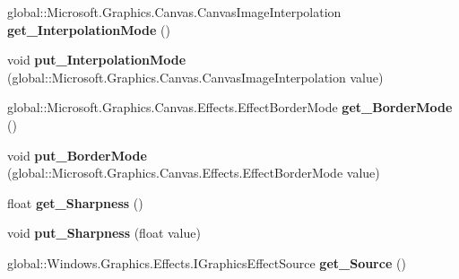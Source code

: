 \begin{DoxyCompactItemize}
global\+::\+Microsoft.\+Graphics.\+Canvas.\+Canvas\+Image\+Interpolation {\bfseries get\+\_\+\+Interpolation\+Mode} ()
\item 
\mbox{\label{interface_microsoft_1_1_graphics_1_1_canvas_1_1_effects_1_1_i_scale_effect_aaaff922db5597526bd069b5b3cfa1bf3}} 
void {\bfseries put\+\_\+\+Interpolation\+Mode} (global\+::\+Microsoft.\+Graphics.\+Canvas.\+Canvas\+Image\+Interpolation value)
\item 
\mbox{\label{interface_microsoft_1_1_graphics_1_1_canvas_1_1_effects_1_1_i_scale_effect_ac46828996e589095068e0beff4165185}} 
global\+::\+Microsoft.\+Graphics.\+Canvas.\+Effects.\+Effect\+Border\+Mode {\bfseries get\+\_\+\+Border\+Mode} ()
\item 
\mbox{\label{interface_microsoft_1_1_graphics_1_1_canvas_1_1_effects_1_1_i_scale_effect_a56c46fac62fdf0f627612c3363b495f4}} 
void {\bfseries put\+\_\+\+Border\+Mode} (global\+::\+Microsoft.\+Graphics.\+Canvas.\+Effects.\+Effect\+Border\+Mode value)
\item 
\mbox{\label{interface_microsoft_1_1_graphics_1_1_canvas_1_1_effects_1_1_i_scale_effect_a76ce1ef01a06978e684a4618f550223f}} 
float {\bfseries get\+\_\+\+Sharpness} ()
\item 
\mbox{\label{interface_microsoft_1_1_graphics_1_1_canvas_1_1_effects_1_1_i_scale_effect_afab0f505adbbffee701a263c3e62fe43}} 
void {\bfseries put\+\_\+\+Sharpness} (float value)
\item 
\mbox{\label{interface_microsoft_1_1_graphics_1_1_canvas_1_1_effects_1_1_i_scale_effect_a5d893ef5b6101520f8cfba14fe6da905}} 
global\+::\+Windows.\+Graphics.\+Effects.\+I\+Graphics\+Effect\+Source {\bfseries get\+\_\+\+Source} ()
\item 
\mbox{\label{interface_microsoft_1_1_graphics_1_1_canvas_1_1_effects_1_1_i_scale_effect_ad103c9b390384b145ae6c1e98f30522e}} 

\end{DoxyCompactItemize}
